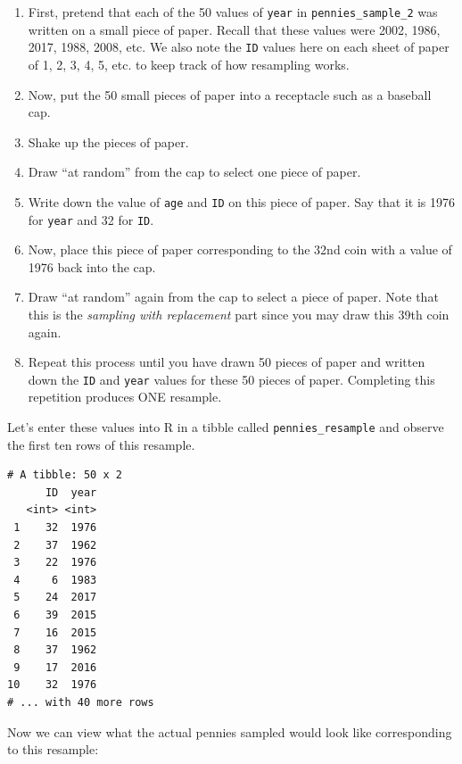 \documentclass[12pt, krantz2,]{krantz}
\providecommand{\tightlist}{%
  \setlength{\itemsep}{0pt}\setlength{\parskip}{0pt}}
\begin{document}
\begin{enumerate}
\def\labelenumi{\arabic{enumi}.}
\tightlist
\item
  First, pretend that each of the 50 values of \texttt{year} in \texttt{pennies\_sample\_2} was written on a small piece of paper. Recall that these values were 2002, 1986, 2017, 1988, 2008, etc. We also note the \texttt{ID} values here on each sheet of paper of 1, 2, 3, 4, 5, etc. to keep track of how resampling works.
\item
  Now, put the 50 small pieces of paper into a receptacle such as a baseball cap.
\item
  Shake up the pieces of paper.
\item
  Draw ``at random'' from the cap to select one piece of paper.
\item
  Write down the value of \texttt{age} and \texttt{ID} on this piece of paper. Say that it is 1976 for \texttt{year} and 32 for \texttt{ID}.
\item
  Now, place this piece of paper corresponding to the 32nd coin with a value of 1976 back into the cap.
\item
  Draw ``at random'' again from the cap to select a piece of paper. Note that this is the \emph{sampling with replacement} part since you may draw this 39th coin again.
\item
  Repeat this process until you have drawn 50 pieces of paper and written down the \texttt{ID} and \texttt{year} values for these 50 pieces of paper. Completing this repetition produces ONE resample.
\end{enumerate}

Let's enter these values into R in a tibble called \texttt{pennies\_resample} and observe the first ten rows of this resample.

\begin{verbatim}
# A tibble: 50 x 2
      ID  year
   <int> <int>
 1    32  1976
 2    37  1962
 3    22  1976
 4     6  1983
 5    24  2017
 6    39  2015
 7    16  2015
 8    37  1962
 9    17  2016
10    32  1976
# ... with 40 more rows
\end{verbatim}

Now we can view what the actual pennies sampled would look like corresponding to this resample:
\end{document}
